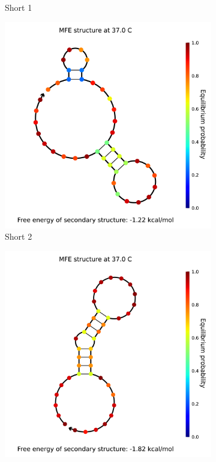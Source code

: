 \begin{figure}[h]
\begin{subfigure}{.32\columnwidth}
  \caption{Short 1}
\end{subfigure}
\begin{subfigure}{.32\columnwidth}
  \centering
  \includegraphics[width=\linewidth]{images/2_analysis.png}
  \caption{Short 2}
\end{subfigure}
\begin{subfigure}{.32\columnwidth}
  \centering
  \includegraphics[width=\linewidth]{images/3_analysis.png}

\end{subfigure}
\end{figure}
